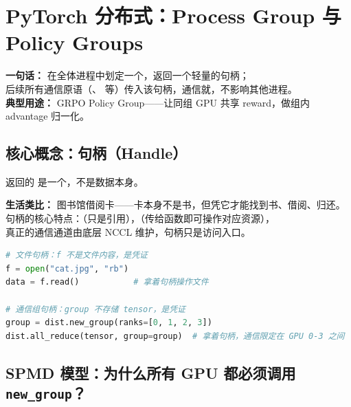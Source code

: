 
\section{PyTorch 分布式：Process Group 与 Policy Groups}

\begin{conceptbox}
\textbf{一句话：}  在全体进程中划定一个，返回一个轻量的句柄；\\
后续所有通信原语（、 等）传入该句柄，通信就，不影响其他进程。\\
\textbf{典型用途：} GRPO Policy Group——让同组 GPU 共享 reward，做组内 advantage 归一化。
\end{conceptbox}

\subsection{核心概念：句柄（Handle）}

 返回的  是一个，不是数据本身。

\begin{intubox}
\textbf{生活类比：} 图书馆借阅卡——卡本身不是书，但凭它才能找到书、借阅、归还。\\
句柄的核心特点：（只是引用），（传给函数即可操作对应资源），\\
真正的通信通道由底层 NCCL 维护，句柄只是访问入口。
\end{intubox}

\begin{lstlisting}[language=Python, caption=句柄类比：文件句柄 vs 通信组句柄]
# 文件句柄：f 不是文件内容，是凭证
f = open("cat.jpg", "rb")
data = f.read()           # 拿着句柄操作文件

# 通信组句柄：group 不存储 tensor，是凭证
group = dist.new_group(ranks=[0, 1, 2, 3])
dist.all_reduce(tensor, group=group)  # 拿着句柄，通信限定在 GPU 0-3 之间
\end{lstlisting}

\subsection{SPMD 模型：为什么所有 GPU 都必须调用 \texttt{new\_group}？}


